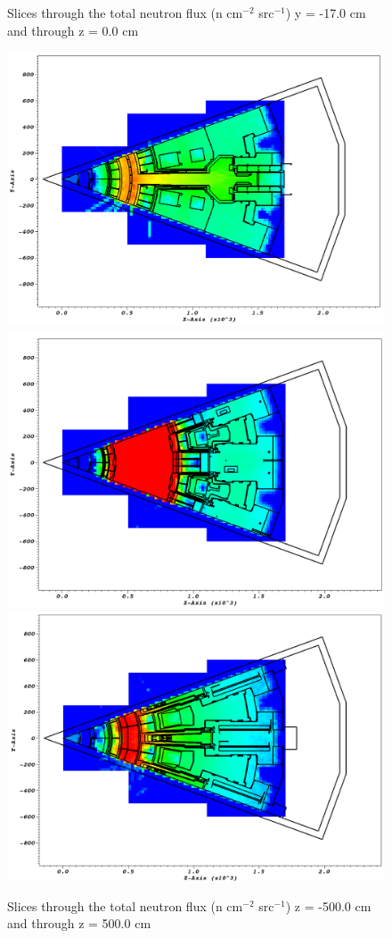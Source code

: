 \documentclass[12pt]{article}
\begin{document}
\begin{figure}[ht!]
  \caption{Slices through the total neutron flux (n cm$^{-2}$ src$^{-1}$) y = -17.0 cm and through z = 0.0 cm}
  \label{fig:wwinp}
\end{figure}
\begin{figure}[ht!]
  \centering
  \includegraphics[scale=0.27]{../plots/neutron/nob4c/z_-500.png}
  \includegraphics[scale=0.27]{../plots/neutron/nob4c/z_0.png}       
  \includegraphics[scale=0.27]{../plots/neutron/nob4c/z_500.png}
  \caption{Slices through the total neutron flux (n cm$^{-2}$ src$^{-1}$) z = -500.0 cm and through z = 500.0 cm}
  \label{fig:wwinp}
\end{figure}
\newpage
\clearpage
\end{document}
